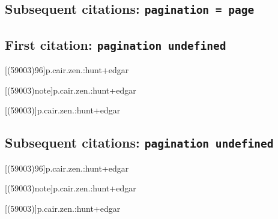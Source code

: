 \documentclass[a4paper]{article}
\begin{document}
\cite{ashurinscription:a}

\citereset
\cite[(obv.\ lines 10)143]{ashurinscription:a}

\citereset
\cite[(obv.\ lines 10--17)note]{ashurinscription:a}

\subsection{Subsequent citations: \texttt{pagination = page}}

\cite{ashurinscription:a}

\cite[(obv.\ lines 10)143]{ashurinscription:a}

\cite[(obv.\ lines 10--17)note]{ashurinscription:a}

\subsection{First citation: \texttt{pagination undefined}}

\cite{p.cair.zen.:hunt+edgar}

\citereset
\cite[(59003)1:96]{p.cair.zen.:hunt+edgar}

\citereset
\cite[(59003)96]{p.cair.zen.:hunt+edgar}

\citereset
{}[(59003)96]{p.cair.zen.:hunt+edgar}

\citereset
\AtNextCite{\renewcommand*{\volcitedelim}{\addcomma\space}}
[(59003)note]{p.cair.zen.:hunt+edgar}

\citereset
{}[(59003)]{p.cair.zen.:hunt+edgar}

\citereset
\cite[(59003)note]{p.cair.zen.:hunt+edgar}

\subsection{Subsequent citations: \texttt{pagination undefined}}

\cite{p.cair.zen.:hunt+edgar}

\cite[(59003)1:96]{p.cair.zen.:hunt+edgar}

\cite[(59003)96]{p.cair.zen.:hunt+edgar}

[(59003)96]{p.cair.zen.:hunt+edgar}

\AtNextCite{\renewcommand*{\volcitedelim}{\addcomma\space}}
[(59003)note]{p.cair.zen.:hunt+edgar}

[(59003)]{p.cair.zen.:hunt+edgar}

\cite[(59003)note]{p.cair.zen.:hunt+edgar}
\end{document}
